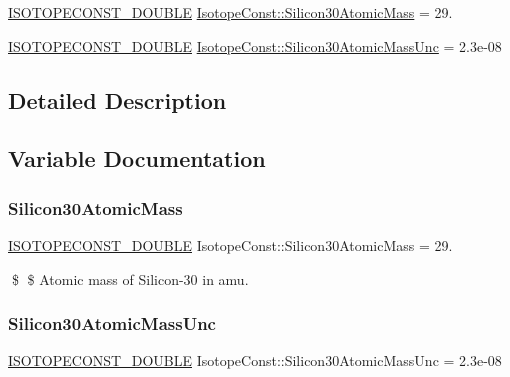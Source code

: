 \begin{DoxyCompactItemize}
\item 
\mbox{\hyperlink{group___isotope_const-_macros_ga8f45a7272ce02c0b4c65c44636ed719a}{I\+S\+O\+T\+O\+P\+E\+C\+O\+N\+S\+T\+\_\+\+D\+O\+U\+B\+LE}} \mbox{\hyperlink{group___isotope_const-_silicon-_si30_ga5d6f425c7b635dd0b9f54b8296d048b6}{Isotope\+Const\+::\+Silicon30\+Atomic\+Mass}} = 29.
\item 
\mbox{\hyperlink{group___isotope_const-_macros_ga8f45a7272ce02c0b4c65c44636ed719a}{I\+S\+O\+T\+O\+P\+E\+C\+O\+N\+S\+T\+\_\+\+D\+O\+U\+B\+LE}} \mbox{\hyperlink{group___isotope_const-_silicon-_si30_ga9cf896a8d8058a47806f619fc44eb1c9}{Isotope\+Const\+::\+Silicon30\+Atomic\+Mass\+Unc}} = 2.\+3e-\/08
\end{DoxyCompactItemize}


\subsection{Detailed Description}


\subsection{Variable Documentation}
\mbox{\label{group___isotope_const-_silicon-_si30_ga5d6f425c7b635dd0b9f54b8296d048b6}} 
\subsubsection{\texorpdfstring{Silicon30\+Atomic\+Mass}{Silicon30AtomicMass}}
{\footnotesize\ttfamily \mbox{\hyperlink{group___isotope_const-_macros_ga8f45a7272ce02c0b4c65c44636ed719a}{I\+S\+O\+T\+O\+P\+E\+C\+O\+N\+S\+T\+\_\+\+D\+O\+U\+B\+LE}} Isotope\+Const\+::\+Silicon30\+Atomic\+Mass = 29.}

\$ \$ Atomic mass of Silicon-\/30 in amu. \mbox{\label{group___isotope_const-_silicon-_si30_ga9cf896a8d8058a47806f619fc44eb1c9}} 
\subsubsection{\texorpdfstring{Silicon30\+Atomic\+Mass\+Unc}{Silicon30AtomicMassUnc}}
{\footnotesize\ttfamily \mbox{\hyperlink{group___isotope_const-_macros_ga8f45a7272ce02c0b4c65c44636ed719a}{I\+S\+O\+T\+O\+P\+E\+C\+O\+N\+S\+T\+\_\+\+D\+O\+U\+B\+LE}} Isotope\+Const\+::\+Silicon30\+Atomic\+Mass\+Unc = 2.\+3e-\/08}

